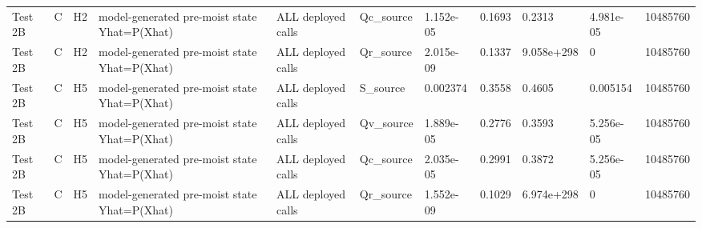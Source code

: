 \begin{tabular}{lllllllllll}
Test 2B & C & H2 & model-generated pre-moist state Yhat=P(Xhat) & ALL deployed calls & Qc\_source & 1.152e-05 & 0.1693 & 0.2313 & 4.981e-05 & 10485760 \\
Test 2B & C & H2 & model-generated pre-moist state Yhat=P(Xhat) & ALL deployed calls & Qr\_source & 2.015e-09 & 0.1337 & 9.058e+298 & 0 & 10485760 \\
Test 2B & C & H5 & model-generated pre-moist state Yhat=P(Xhat) & ALL deployed calls & S\_source & 0.002374 & 0.3558 & 0.4605 & 0.005154 & 10485760 \\
Test 2B & C & H5 & model-generated pre-moist state Yhat=P(Xhat) & ALL deployed calls & Qv\_source & 1.889e-05 & 0.2776 & 0.3593 & 5.256e-05 & 10485760 \\
Test 2B & C & H5 & model-generated pre-moist state Yhat=P(Xhat) & ALL deployed calls & Qc\_source & 2.035e-05 & 0.2991 & 0.3872 & 5.256e-05 & 10485760 \\
Test 2B & C & H5 & model-generated pre-moist state Yhat=P(Xhat) & ALL deployed calls & Qr\_source & 1.552e-09 & 0.1029 & 6.974e+298 & 0 & 10485760 \\
\hline
\end{tabular}
